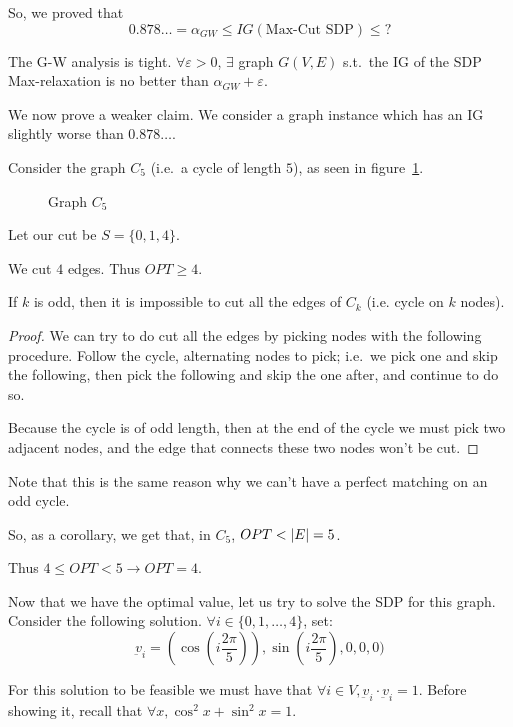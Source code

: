     So, we proved that
    \[ 0.878\dots = \alpha_{GW} \leq IG (\text{Max-Cut SDP}) \leq ? \]

    The G-W analysis is tight.
    $\forall \varepsilon > 0$, $\exists$ graph $G(V,E)$ s.t.~the IG of the SDP Max-relaxation is no better than $\alpha_{GW} + \varepsilon$.

    We now prove a weaker claim.
    We consider a graph instance which has an IG slightly worse than $0.878\dots$.

    Consider the graph $C_5$ (i.e.~a cycle of length $5$), as seen in figure~\ref{fig:c5}.

    \begin{figure}[h]
        \centering
        
        \caption{Graph $C_5$}
        \label{fig:c5}
    \end{figure}

    Let our cut be $S = \{ 0,1,4 \}$.

    We cut $4$ edges. Thus $OPT \geq 4$.

    \begin{lemma}
        If $k$ is odd, then it is impossible to cut all the edges of $C_k$ (i.e. cycle on $k$ nodes).
    \end{lemma}

    \begin{proof}
        We can try to do cut all the edges by picking nodes with the following procedure.
        Follow the cycle, alternating nodes to pick; i.e.~we pick one and skip the following, then pick the following and skip the one after, and continue to do so.

        Because the cycle is of odd length, then at the end of the cycle we must pick two adjacent nodes, and the edge that connects these two nodes won't be cut.
    \end{proof}

    Note that this is the same reason why we can't have a perfect matching on an odd cycle.

    So, as a corollary, we get that, in $C_5$, $OPT < \vert E \vert = 5$.

    Thus $4 \leq OPT < 5 \rightarrow OPT=4$.

    Now that we have the optimal value, let us try to solve the SDP for this graph.
    Consider the following solution. $\forall i \in \{ 0,1, \dots, 4 \}$, set:
    \[ \underbar{v}_i = (\cos (i \frac{2\pi}{5})), \sin (i \frac{2\pi}{5}), 0,0,0) \]

    For this solution to be feasible we must have that $\forall i \in V, \underbar{v}_i \cdot \underbar{v}_i = 1$.
    Before showing it, recall that $\forall x, \cos^2 x + \sin^2 x = 1$.

